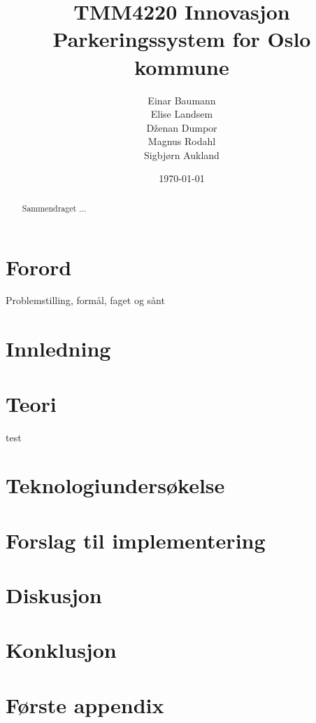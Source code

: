 \documentclass[a4paper, norsk, 12pt]{article}
\title{TMM4220 Innovasjon \\ 
\vspace{6pt}\large Parkeringssystem for Oslo kommune \\ \vspace{50pt} 
 }
\author{Einar Baumann \\Elise Landsem\\D\v{z}enan Dumpor\\Magnus Rodahl\\Sigbjørn Aukland}
\date{\today}
\theoremstyle{remark}
\begin{document}
\maketitle
\thispagestyle{empty}
\vspace{50pt}
\begin{abstract}
Sammendraget ...
\end{abstract}
\pagebreak

\tableofcontents
\pagebreak

\section*{Forord}
Problemstilling, formål, faget og sånt
\pagebreak



\section{Innledning}
\label{sec:innledning}





\section{Teori}
\label{sec:teori}
test





\section{Teknologiundersøkelse}
\label{sec:teknologi}






\section{Forslag til implementering}
\label{sec:implementering}






\section{Diskusjon}
\label{sec:diskusjon}







\section{Konklusjon}
\label{sec:konklusjon}







\pagebreak
{}

\pagebreak




\appendix

\section{Første appendix}
\label{sec:}

\end{document}
